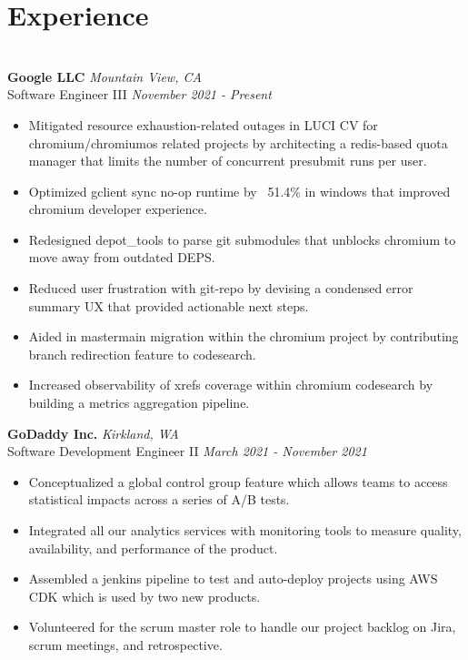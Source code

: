 \documentclass{resume}
\author{https://aravindvasu.dev}{Aravind Vasudevan}
\begin{document}
\maketitle
\section*{Experience}
\titlerule[0.2pt]
\noindent
\\
\textbf{Google LLC} \hfill \textit{Mountain View, CA} \\
{\small Software Engineer III} \hfill \textit{\small November 2021 - Present}
\begin{itemize}
  \item Mitigated resource exhaustion-related outages in LUCI CV for chromium/chromiumos related projects by architecting a redis-based quota manager that limits the number of concurrent presubmit runs per user.
  \item Optimized gclient sync no-op runtime by ~51.4\% in windows that improved chromium developer experience.
  \item Redesigned depot\_tools to parse git submodules that unblocks chromium to move away from outdated DEPS.
  \item Reduced user frustration with git-repo by devising a condensed error summary UX that provided actionable next steps.
  \item Aided in master\textrightarrow main migration within the chromium project by contributing branch redirection feature to codesearch.
  \item Increased observability of xrefs coverage within chromium codesearch by building a metrics aggregation pipeline.
\end{itemize}
\textbf{GoDaddy Inc.} \hfill \textit{Kirkland, WA} \\
{\small Software Development Engineer II} \hfill \textit{\small March 2021 - November 2021}
\begin{itemize}
  \item Conceptualized a global control group feature which allows teams to access statistical impacts across a series of A/B tests.
  \item Integrated all our analytics services with monitoring tools to measure quality, availability, and performance of the product.
  \item Assembled a jenkins pipeline to test and auto-deploy projects using AWS CDK which is used by two new products.
  \item Volunteered for the scrum master role to handle our project backlog on Jira, scrum meetings, and retrospective.
\end{itemize}
\end{document}
